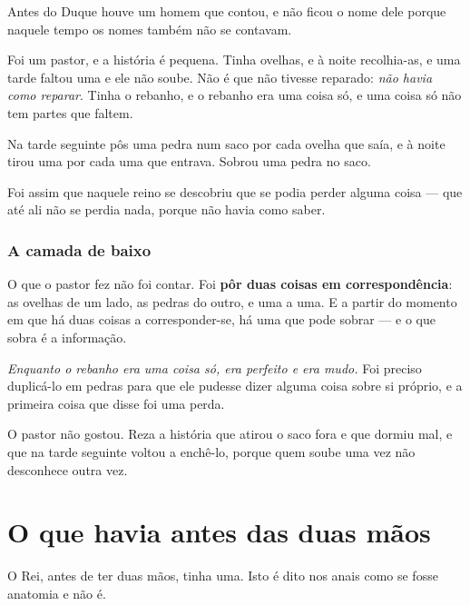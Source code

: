 \documentclass[livro.tex]{subfiles}
\begin{document}
Antes do Duque houve um homem que contou, e não ficou o nome dele porque naquele tempo os nomes
também não se contavam.

\medskip

Foi um pastor, e a história é pequena. Tinha ovelhas, e à noite recolhia-as, e uma tarde faltou
uma e ele não soube. Não é que não tivesse reparado: \emph{não havia como reparar}. Tinha o
rebanho, e o rebanho era uma coisa só, e uma coisa só não tem partes que faltem.

\medskip

Na tarde seguinte pôs uma pedra num saco por cada ovelha que saía, e à noite tirou uma por cada
uma que entrava. Sobrou uma pedra no saco.

\medskip

Foi assim que naquele reino se descobriu que se podia perder alguma coisa --- que até ali não se
perdia nada, porque não havia como saber.

\subsection*{A camada de baixo}

O que o pastor fez não foi contar. Foi \textbf{pôr duas coisas em correspondência}: as ovelhas de
um lado, as pedras do outro, e uma a uma. E a partir do momento em que há duas coisas a
corresponder-se, há uma que pode sobrar --- e o que sobra é a informação.

\medskip

\emph{Enquanto o rebanho era uma coisa só, era perfeito e era mudo.} Foi preciso duplicá-lo em
pedras para que ele pudesse dizer alguma coisa sobre si próprio, e a primeira coisa que disse foi
uma perda.

\medskip

O pastor não gostou. Reza a história que atirou o saco fora e que dormiu mal, e que na tarde
seguinte voltou a enchê-lo, porque quem soube uma vez não desconhece outra vez.

\chapter{O que havia antes das duas mãos}

O Rei, antes de ter duas mãos, tinha uma. Isto é dito nos anais como se fosse anatomia e não é.
\end{document}
